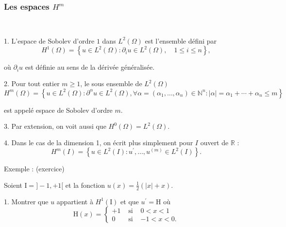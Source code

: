 \subsubsection{Les espaces $H^{m}$}

\begin{definition}\
	
1. 	L'espace de Sobolev d'ordre $1 $  dans  $L^{2}(\Omega)$  est l'ensemble défini par
$$
H^{1}(\Omega)=\left\{u \in L^{2}(\Omega) : \partial_{i} u \in L^{2}(\Omega), \quad 1 \leq i \leq n\right\},
$$ 

où $\partial_{i} u$ est définie au sens de la dérivée généralisée. 

 2. Pour tout entier $m \geq 1$, le sous ensemble de $L^{2}(\Omega)$
$$
H^{m}(\Omega)=\left\{u \in L^{2}(\Omega): \partial^{\alpha} u \in L^{2}(\Omega),  \forall \alpha=\left(\alpha_{1}, \ldots, \alpha_{n}\right) \in \mathbb{N}^{n}: |\alpha|=\alpha_{1}+\cdots+\alpha_{n} \leq m\right\}
$$

est appelé espace de Sobolev d'ordre $m$.

3. Par extension, on voit aussi que $H^{0}(\Omega)=L^{2}(\Omega)$.

4. Dans le cas de la dimension 1, on écrit plus simplement pour $I$ ouvert de $\mathbb{R}$ :
$$
H^{m}(I)=\left\{u \in L^{2}(I) :  u^{\prime}, \ldots, u^{(m)} \in L^{2}(I)\right\}.
$$

\end{definition}

Exemple :  (exercice)  

Soient $\mathrm{I}=]-1,+1[ $ et  la fonction $u(x)=\frac{1}{2}(|x|+x)$. 

1. Montrer  que $u$  appartient à $H^1(\mathrm{I})$  et que $u^{\prime}=\mathrm{H}$ où
$$
\mathrm{H}(x)=\left\{\begin{array}{clrl}
	+1 & \text { si } & 0<x<1 \\
	0 & \text { si } & -1<x<0.
\end{array}\right.
$$

